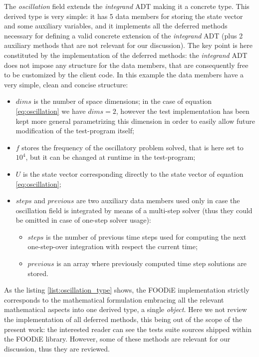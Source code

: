 \documentclass[pdftex,preprint,3p,times,numbers]{elsarticle}
\begin{document}
The \emph{oscillation} field extends the \emph{integrand} ADT making it a concrete type. This derived type is very simple: it has 5 data members for storing the state vector and some auxiliary variables, and it implements all the deferred methods necessary for defining a valid concrete extension of the \emph{integrand} ADT (plus 2 auxiliary methods that are not relevant for our discussion). The key point is here constituted by the implementation of the deferred methods: the \emph{integrand} ADT does not impose any structure for the data members, that are consequently free to be customized by the client code. In this example the data members have a very simple, clean and concise structure:
\begin{itemize}
  \item $dims$ is the number of space dimensions; in the case of equation \ref{eq:oscillation} we have $dims=2$, however the test implementation has been kept more general parametrizing this dimension in order to easily allow future modification of the test-program itself;
  \item $f$ stores the frequency of the oscillatory problem solved, that is here set to $10^{4}$, but it can be changed at runtime in the test-program;
  \item $U$ is the state vector corresponding directly to the state vector of equation \ref{eq:oscillation};
  \item $steps$ and $previous$ are two auxiliary data members used only in case the oscillation field is integrated by means of a multi-step solver (thus they could be omitted in case of one-step solver usage):
    \begin{itemize}
      \item $steps$ is the number of previous time steps used for computing the next one-step-over integration with respect the current time;
      \item $previous$ is an array where previously computed time step solutions are stored.
      \end{itemize}
  \end{itemize}

As the listing \ref{list:oscillation_type} shows, the FOODiE implementation strictly corresponds to the mathematical formulation embracing all the relevant mathematical aspects into one derived type, a single \emph{object}. Here we not review the implementation of all deferred methods, this being out of the scope of the present work: the interested reader can see the tests suite sources shipped within the FOODiE library. However, some of these methods are relevant for our discussion, thus they are reviewed.
\end{document}

